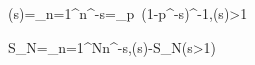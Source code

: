\zeta(s)=\sum_{n=1}^{\infty}n^{-s}=\prod_{p\ }(1-p^{-s})^{-1},\quad{}(s)>1

S_N=\sum_{n=1}^{N}n^{-s},\qquad {}\le\zeta(s)-S_N\le{}\quad(s>1)
